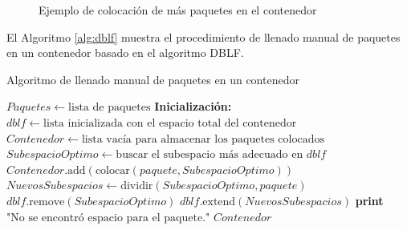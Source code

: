 \documentclass[openany]{article}
\begin{document}
\begin{figure}[H]
    \centering
    
    \caption{Ejemplo de colocación de más paquetes en el contenedor}
    \label{fig:contruccion_muro}
\end{figure}

El Algoritmo \ref{alg:dblf} muestra el procedimiento de llenado manual de paquetes en un contenedor basado en el algoritmo DBLF.

\begin{algorithm}[H]
    \caption{Algoritmo de llenado manual de paquetes en un contenedor}
    \label{alg:dblf}
    \begin{algorithmic}[1]
        \State $Paquetes \gets \text{lista de paquetes}$
        \State \textbf{Inicialización:} $dblf \gets \text{lista inicializada con el espacio total del contenedor}$
        \State $Contenedor \gets \text{lista vacía para almacenar los paquetes colocados}$
        \State $SubespacioOptimo \gets \text{buscar el subespacio más adecuado en } dblf$
        \State $Contenedor.\text{add}( \text{colocar}(paquete, SubespacioOptimo) )$
        \State $NuevosSubespacios \gets \text{dividir}(SubespacioOptimo, paquete)$
        \State $dblf.\text{remove}(SubespacioOptimo)$
        \State $dblf.\text{extend}(NuevosSubespacios)$
        \Else
        \State \textbf{print} $\text{"No se encontró espacio para el paquete."}$
        \EndIf
        \EndFor
        \State \Return $Contenedor$
    \end{algorithmic}
\end{algorithm}
\end{document}
